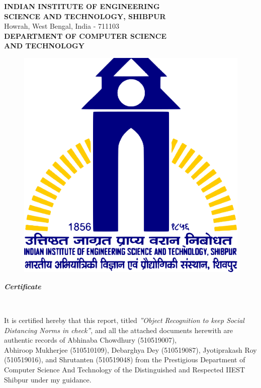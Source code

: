 \documentclass[a4paper]{article}
\begin{document}
\begin{titlepage}

    \begin{center}
        \textup{\large  \textbf{INDIAN INSTITUTE OF ENGINEERING}\\\textbf{SCIENCE AND TECHNOLOGY, SHIBPUR}}\\ Howrah, West Bengal, India - 711103\\[0.5cm]\textbf{\large DEPARTMENT OF COMPUTER SCIENCE}\\\textbf{\large AND TECHNOLOGY}

        \begin{center}
            \begin{figure}[h]   %
                \centering
                \includegraphics[width=0.3\linewidth]{Pictures/IIESTS Logo.png}
            \end{figure}
        \end{center}



        \begin{LARGE}
            \textbf{\textit {Certificate}}
        \end{LARGE}\\[1.2cm]
    \end{center}

    It is certified hereby that this report, titled \textit{”Object Recognition to keep Social Distancing Norms in check”}, and all the attached
    documents herewith are authentic records of Abhinaba Chowdhury (510519007),\\Abhiroop Mukherjee (510510109), Debarghya Dey (510519087),
    Jyotiprakash Roy \\(510519016), and Shrutanten (510519048) from the Prestigious Department of \\Computer Science And Technology
    of the Distinguished and Respected IIEST Shibpur under my guidance.


\end{titlepage}
\end{document}
